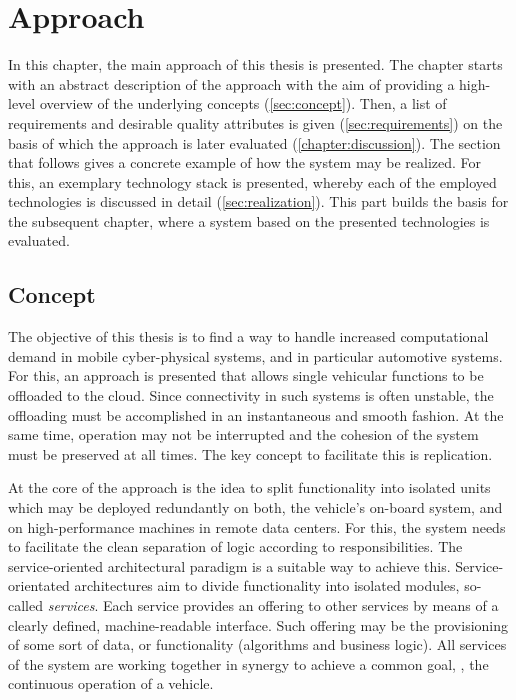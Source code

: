 
\chapter{Approach}\label{chapter:realization}

In this chapter, the main approach of this thesis is presented. The chapter starts with an abstract description of the approach with the aim of providing a high-level overview of the underlying concepts (\autoref{sec:concept}). Then, a list of requirements and desirable quality attributes is given (\autoref{sec:requirements}) on the basis of which the approach is later evaluated (\autoref{chapter:discussion}). The section that follows gives a concrete example of how the system may be realized. For this, an exemplary technology stack is presented, whereby each of the employed technologies is discussed in detail (\autoref{sec:realization}). This part builds the basis for the subsequent chapter, where a system based on the presented technologies is evaluated.

%
%
%
%
%
%
%
%
%
%

\section{Concept} \label{sec:concept}
The objective of this thesis is to find a way to handle increased computational demand in mobile cyber-physical systems, and in particular automotive systems. For this, an approach is presented that allows single vehicular functions to be offloaded to the cloud.
Since connectivity in such systems is often unstable, the offloading must be accomplished in an instantaneous and smooth fashion. At the same time, operation may not be interrupted and the cohesion of the system must be preserved at all times. The key concept to facilitate this is replication. 

At the core of the approach is the idea to split functionality into isolated units which may be deployed redundantly on both, the vehicle's on-board system, and on high-performance machines in remote data centers. For this, the system needs to facilitate the clean separation of logic according to responsibilities. The service-oriented architectural paradigm is a suitable way to achieve this. Service-orientated architectures aim to divide functionality into isolated modules, so-called \emph{services}. Each service provides an offering to other services by means of a clearly defined, machine-readable interface. Such offering may be the provisioning of some sort of data, or functionality (algorithms and business logic). All services of the system are working together in synergy to achieve a common goal, \ie , the continuous operation of a vehicle. 

